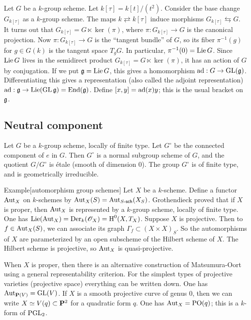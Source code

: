 Let $G$ be a $k$-group scheme. Let $k[\tau]=k[t]/(t^2)$. Consider the base 
change $G_{k[\tau]}$ as a $k$-group scheme. The maps $k\rightleftarrows k[\tau]$ 
induce morphisms $G_{k[\tau]} \leftrightarrows G$. It turns out that 
$G_{k[\tau]} = G\ltimes \ker(\pi)$, where $\pi:G_{k[\tau]} \to G$ is the canonical 
projection. Now $\pi:G_{k[\tau]}\to G$ is the ``tangent bundle'' of 
$G$, so its fiber $\pi^{-1}(g)$ for $g\in G(k)$ is the tangent space 
$T_g G$. In particular, $\pi^{-1}(0) = \operatorname{Lie} G$. Since $\operatorname{Lie} G$ lives in the 
semidirect product $G_{k[\tau]} = G\ltimes \ker(\pi)$, it has an action of 
$G$ by conjugation. If we put $\mathfrak{g}=\operatorname{Lie} G$, this gives a homomorphism 
$\operatorname{ad}:G\to \operatorname{GL}(\mathfrak{g})$. Differentiating this gives a representation 
(also called the adjoint representation) 
$\operatorname{ad}:\mathfrak{g} \to \operatorname{Lie}(\operatorname{GL}\mathfrak{g}) = \operatorname{End}(\mathfrak{g})$. Define 
$[x,y] = \operatorname{ad}(x) y$; this is the usual bracket on $\mathfrak{g}$. 


\subsection{Neutral component}

Let $G$ be a $k$-group scheme, locally of finite type. Let $G^\circ$ be the 
connected component of $e$ in $G$. Then $G^\circ$ is a normal subgroup scheme 
of $G$, and the quotient $G/G^\circ$ is \'etale (smooth of dimension $0$). The 
group $G^\circ$ is of finite type, and is geometrically irreducible. 

\begin{enonce}{Example}[automorphism group schemes]
Let $X$ be a $k$-scheme. Define a functor $\operatorname{Aut}_X$ on $k$-schemes 
by $\operatorname{Aut}_X(S) = \operatorname{Aut}_{S\textnormal{-}\mathsf{sch}}(X_S)$. 
Grothendieck proved that if $X$ is proper, then $\operatorname{Aut}_X$ is represented by a 
$k$-group scheme, locally of finite type. One has 
$\operatorname{Lie}(\operatorname{Aut}_X) = \operatorname{Der}_k(\mathscr{O}_X) = \operatorname{H}^0(X,T_X)$. Suppose 
$X$ is projective. Then to $f\in \operatorname{Aut}_X(S)$, we can associate its 
graph $\Gamma_f\subset (X\times X)_S$. So the automorphisms of $X$ are 
parameterized by an open subscheme of the Hilbert scheme of $X$. The Hilbert 
scheme is projective, so $\operatorname{Aut}_X$ is quasi-projective. 
\end{enonce}

When $X$ is proper, then there is an alternative construction of 
Matsumura-Oort using a general representability criterion. 
For the simplest types of projective varieties (projective space) everything 
can be written down. One has $\operatorname{Aut}_{\mathbf{P}(V)} = \operatorname{GL}(V)$. 
If $X$ is a smooth projective curve of genus $0$, then we can write 
$X\simeq V(q)\subset \mathbf{P}^2$ for a quadratic form $q$. One has 
$\operatorname{Aut}_X=\operatorname{PO}(q)$; this is a $k$-form of 
$\operatorname{PGL}_2$. 

